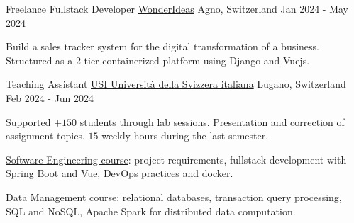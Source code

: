 

\begin{cventries}

  \cventry
    {Freelance Fullstack Developer} %
    {\href{https://www.wonderideas.ch/}{WonderIdeas}} %
    {Agno, Switzerland} %
    {Jan 2024 - May 2024} %
    {
    \begin{cvitems}
        \item{Build a sales tracker system 
        for the digital transformation of a business. 
        Structured as a 2 tier containerized platform 
        using Django and Vuejs.}
    \end{cvitems}
    }
  
  \cventry
    {Teaching Assistant} %
    {\href{https://www.usi.ch/en}{%
    USI Università della Svizzera italiana}} %
    {Lugano, Switzerland} %
    {Feb 2024 - Jun 2024} %
    {
      \begin{cvitems} %
      \item {Supported \( +150 \) students through lab sessions.
        Presentation and correction of assignment topics.
        \( 15 \) weekly hours during the last semester. }
      \item {\href{https://search.usi.ch/it/corsi/35268192/software-atelier-4-software-engineering-project}{%
      Software Engineering course}: 
      project requirements, 
      fullstack development with Spring Boot and Vue, 
      DevOps practices and docker.}
      \item {\href{https://search.usi.ch/it/corsi/35268184/data-management}{%
      Data Management course}: 
      relational databases, 
      transaction query processing, 
      SQL and NoSQL, 
      Apache Spark for distributed data computation.}
      \end{cvitems}
    }


\end{cventries}
